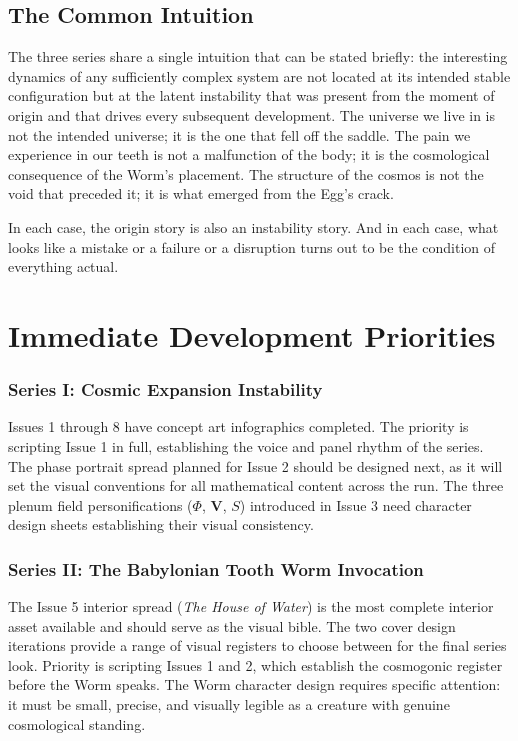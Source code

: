 \documentclass[12pt, a4paper]{article}
\begin{document}
\subsection{The Common Intuition}

The three series share a single intuition that can be stated briefly: the interesting dynamics of any sufficiently complex system are not located at its intended stable configuration but at the latent instability that was present from the moment of origin and that drives every subsequent development. The universe we live in is not the intended universe; it is the one that fell off the saddle. The pain we experience in our teeth is not a malfunction of the body; it is the cosmological consequence of the Worm's placement. The structure of the cosmos is not the void that preceded it; it is what emerged from the Egg's crack.

In each case, the origin story is also an instability story. And in each case, what looks like a mistake or a failure or a disruption turns out to be the condition of everything actual.

\newpage
\section{Immediate Development Priorities}

\subsubsection{Series I: Cosmic Expansion Instability}

Issues 1 through 8 have concept art infographics completed. The priority is scripting Issue 1 in full, establishing the voice and panel rhythm of the series. The phase portrait spread planned for Issue 2 should be designed next, as it will set the visual conventions for all mathematical content across the run. The three plenum field personifications ($\Phi$, $\mathbf{V}$, $S$) introduced in Issue 3 need character design sheets establishing their visual consistency.

\subsubsection{Series II: The Babylonian Tooth Worm Invocation}

The Issue 5 interior spread (\textit{The House of Water}) is the most complete interior asset available and should serve as the visual bible. The two cover design iterations provide a range of visual registers to choose between for the final series look. Priority is scripting Issues 1 and 2, which establish the cosmogonic register before the Worm speaks. The Worm character design requires specific attention: it must be small, precise, and visually legible as a creature with genuine cosmological standing.
\end{document}
